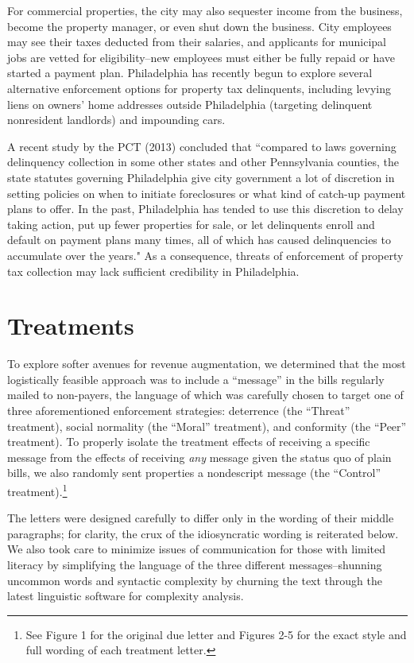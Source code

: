 \documentclass[12pt,titlepage]{article}
\begin{document}
For commercial properties, the city may also sequester income from the
business, become the property manager, or even shut down the
business. City employees may see their taxes deducted from their
salaries, and applicants for municipal jobs are vetted for
eligibility--new employees must either be fully repaid or have
started a payment plan. Philadelphia has recently begun to explore
several alternative enforcement options for property tax delinquents,
including levying liens on owners' home addresses outside Philadelphia
(targeting delinquent nonresident landlords) and impounding cars.

A recent study by the PCT (2013) concluded that ``compared to laws
governing delinquency collection in some other states and other
Pennsylvania counties, the state statutes governing Philadelphia give
city government a lot of discretion in setting policies on when to
initiate foreclosures or what kind of catch-up payment plans to
offer. In the past, Philadelphia has tended to use this discretion to
delay taking action, put up fewer properties for sale, or let
delinquents enroll and default on payment plans many times, all of
which has caused delinquencies to accumulate over the years." As a
consequence, threats of enforcement of property tax
collection may lack sufficient credibility in Philadelphia.

\section{Treatments}

To explore softer avenues for revenue augmentation, we determined
that the most logistically feasible approach was to include a
``message'' in the bills regularly mailed to non-payers, the language
of which was carefully chosen to target one of three aforementioned enforcement
strategies: deterrence (the ``Threat'' treatment), social normality
(the ``Moral'' treatment), and conformity (the ``Peer'' treatment). To
properly isolate the treatment effects of receiving a specific message
from the effects of receiving \textit{any} message given the status
quo of plain bills, we also randomly sent properties a nondescript message
(the ``Control'' treatment).\footnote{See Figure 1 for the original due letter and 
  Figures 2-5 for the exact style and full wording of each treatment letter.}
 
The letters were designed carefully to differ only in the wording of
their middle paragraphs; for clarity, the crux of the idiosyncratic wording is
reiterated below. We also took care to minimize issues of communication
for those with limited literacy by simplifying the language of the
three different messages--shunning uncommon words and syntactic
complexity by churning the text through the latest linguistic software
for complexity analysis.
\end{document}
